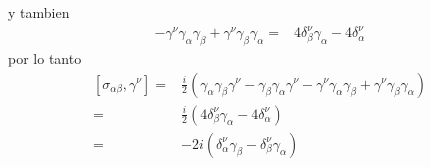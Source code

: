 y tambien
\begin{align*}
    - \gamma^\nu \gamma_\alpha \gamma_\beta + \gamma^\nu\gamma_\beta \gamma_\alpha =& 4\delta_\beta^\nu  \gamma_\alpha - 4\delta_\alpha^\nu
\end{align*}
por lo tanto
\begin{align*}
    \left[\sigma_{\alpha \beta} , \gamma^\nu \right] =& \frac{i}{2} \left(\gamma_\alpha \gamma_\beta \gamma^\nu- \gamma_\beta \gamma_\alpha\gamma^\nu - \gamma^\nu \gamma_\alpha \gamma_\beta + \gamma^\nu\gamma_\beta \gamma_\alpha\right)\\
    =& \frac{i}{2} \left(4\delta_\beta^\nu  \gamma_\alpha - 4\delta_\alpha^\nu \right) \\
    =& -2i \left(\delta_\alpha^\nu \gamma_\beta-\delta_\beta^\nu  \gamma_\alpha\right)
\end{align*}